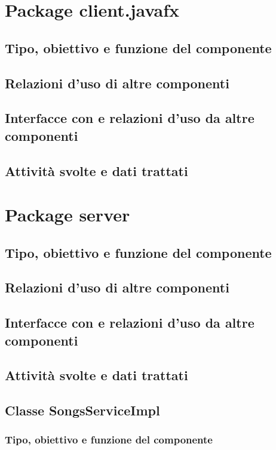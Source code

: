\section{Package client.javafx} %
\subsection*{Tipo, obiettivo e funzione del componente}
\subsection*{Relazioni d'uso di altre componenti}
\subsection*{Interfacce con e relazioni d'uso da altre componenti}
\subsection*{Attivit\`a svolte e dati trattati}
\newpage
\section{Package server} %
\subsection*{Tipo, obiettivo e funzione del componente}
\subsection*{Relazioni d'uso di altre componenti}
\subsection*{Interfacce con e relazioni d'uso da altre componenti}
\subsection*{Attivit\`a svolte e dati trattati}

\subsection{Classe SongsServiceImpl}
\subsubsection*{Tipo, obiettivo e funzione del componente}
